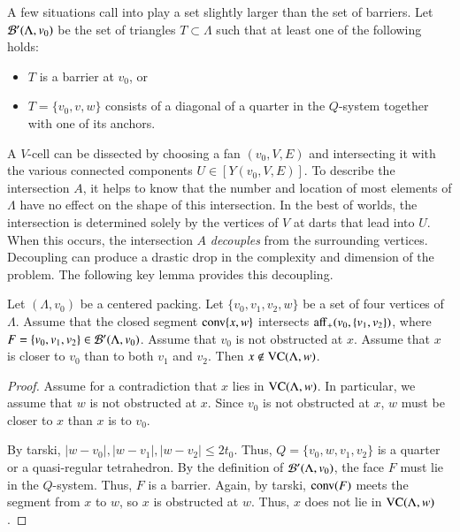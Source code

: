 A few situations call into play a set slightly larger than the set of barriers.
Let ${\mathcal B}'(\Lambda,v_0)$ be the set of triangles $T\subset \Lambda$ such that at least one
of the following holds:
\begin{itemize}
    \item $T$ is a barrier at $v_0$, or
    \item $T=\{v_0,v,w\}$ consists of a diagonal of a quarter in the
    $Q$-system together with one of its anchors.
\end{itemize}


A $V$-cell  can be dissected by choosing a fan
$(v_0,V,E)$ and intersecting it with the various connected components
$U\in [Y(v_0,V,E)]$.  To describe the intersection $A$, it
helps to know that the number and location of
most elements of $\Lambda$ have no effect on the shape of this intersection.
In the best of worlds, the intersection is determined solely 
by the vertices of $V$
at darts that lead into $U$.  When this occurs, the intersection $A$ 
{\it decouples} from the surrounding vertices. Decoupling  can
produce
a drastic drop in the complexity and dimension of the problem.
The following key lemma provides this decoupling.

\begin{lemma} 
Let $(\Lambda,v_0)$ be a centered packing.  Let $\{v_0,v_1,v_2,w\}$
be a set of four vertices of $\Lambda$. 
Assume that the closed segment
${\operatorname{conv}}\{x,w\}$ intersects ${\operatorname{aff}}_+(v_0,\{v_1,v_2\})$, where
$F = \{v_0,v_1,v_2\}\in {\mathcal B}'(\Lambda,v_0)$. Assume that $v_0$ 
is not obstructed at $x$. Assume that $x$ is closer to $v_0$ 
than to both $v_1$ and $v_2$. Then $x\not\in{\operatorname{VC}}(\Lambda,w)$.
\end{lemma}


\begin{proof}
Assume for a contradiction that $x$ lies in ${\operatorname{VC}}(\Lambda,w)$. In
particular, we assume that $w$ is not obstructed at $x$.  Since
$v_0$ is not obstructed at $x$, $w$ must be closer to $x$
than $x$ is to $v_0$.

By tarski, 
   $|w-v_0|,|w-v_1|,|w-v_2|\le 2t_0$.  Thus, $Q=\{v_0,w,v_1,v_2\}$ is
a quarter or a quasi-regular tetrahedron.  By the definition of
${\mathcal B}'(\Lambda,v_0)$, the face $F$ must lie in the $Q$-system.  Thus,
$F$ is a barrier.  Again, by tarski,
${\operatorname{conv}}(F)$ meets the segment from $x$ to $w$, so $x$ is obstructed
at $w$.  Thus, $x$ does not lie in ${\operatorname{VC}}(\Lambda,w)$.
\end{proof}

